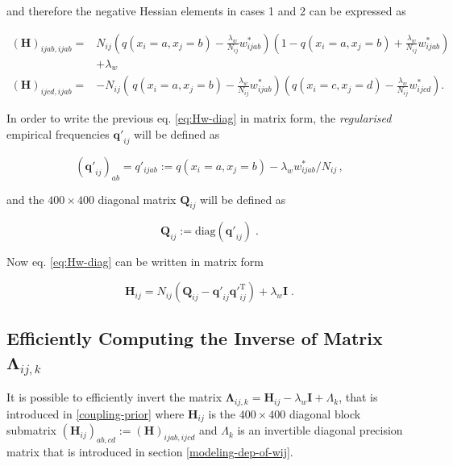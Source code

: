 \documentclass[12pt,a4paper,twoside]{book}
\newcommand{\eq}{\!=\!}
\renewcommand{\H}{\mathbf{H}}
\newcommand{\I}{\mathbf{I}}
\newcommand{\Lijk}{\mathbf{\Lambda}_{ij,k}}
\newcommand{\Qij}{\mathbf{Q}_{ij}}
\newcommand{\qij}{\mathbf{q\prime}_{ij}}
\newcommand{\wijab}{w_{ijab}}
\newcommand{\wijcd}{w_{ijcd}}
\theoremstyle{definition}
\theoremstyle{definition}
\theoremstyle{remark}
\begin{document}
and therefore the negative Hessian elements in cases 1 and 2 can be
expressed as

\begin{align}
   (\H)_{ijab, ijab} =& N_{ij} \left( q(x_i \eq a, x_j \eq b)  - \frac{\lambda_w}{N_{ij}} \wijab^* \right) \left( 1 - q(x_i \eq a, x_j \eq b) +\frac{\lambda_w}{N_{ij}} \wijab^* \right) \\
   & + \lambda_w \\
   (\H)_{ijcd, ijab} =& -N_{ij} \left(\,q(x_i \eq a, x_j \eq b)  - \frac{\lambda_w}{N_{ij}} \wijab^* \right) \left( q(x_i \eq c, x_j \eq d) -\frac{\lambda_w}{N_{ij}} \wijcd^* \right) .
\label{eq:Hw-diag}
\end{align}

In order to write the previous eq. \eqref{eq:Hw-diag} in matrix form, the
\emph{regularised} empirical frequencies \(\qij\) will be defined as

\begin{equation}
    (\qij)_{ab} = q'_{ijab} := q(x_i \eq a, x_j \eq b) - \lambda_w  \wijab^* / N_{ij} \,,
\end{equation}

and the \(400 \times 400\) diagonal matrix \(\Qij\) will be defined as

\begin{equation}
    \Qij := \text{diag}(\qij) \; .
\end{equation}

Now eq. \eqref{eq:Hw-diag} can be written in matrix form

\begin{equation}
     \H_{ij} = N_{ij} \left( \Qij -  \qij \qij^{\mathrm{T}} \right)  + \lambda_w \I \; .
\label{eq:mat-Hij}
\end{equation}

\subsection{\texorpdfstring{Efficiently Computing the Inverse of Matrix
\(\Lijk\)}{Efficiently Computing the Inverse of Matrix \textbackslash{}Lijk}}\label{inv-lambda-ij-k}

It is possible to efficiently invert the matrix
\(\Lijk = \H_{ij} - \lambda_w \I + \Lambda_k\), that is introduced in
\ref{coupling-prior} where \(\H_{ij}\) is the \(400 \times 400\)
diagonal block submatrix \((\H_{ij})_{ab,cd} := (\H)_{ijab,ijcd}\) and
\(\Lambda_k\) is an invertible diagonal precision matrix that is
introduced in section \ref{modeling-dep-of-wij}.
\end{document}
